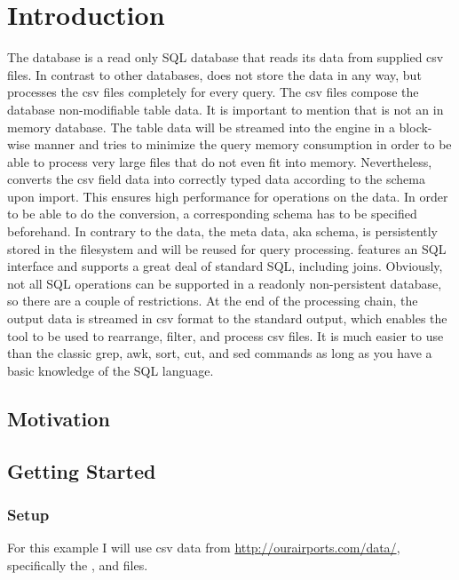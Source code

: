
\chapter{Introduction}
The \csvsqldb{} database is a read only SQL database that reads its data from supplied csv files. In contrast to other databases, \csvsqldb{} does not store the data in any way, but processes the csv files completely for every query. The csv files compose the database non-modifiable table data. It is important to mention that \csvsqldb{} is not an in memory database. The table data will be streamed into the engine in a block-wise manner and \csvsqldb{} tries to minimize the query memory consumption in order to be able to process very large files that do not even fit into memory. Nevertheless, \csvsqldb{} converts the csv field data into correctly typed data according to the schema upon import. This ensures high performance for operations on the data. In order to be able to do the conversion, a corresponding schema has to be specified beforehand. In contrary to the data, the meta data, aka schema, is persistently stored in the filesystem and will be reused for query processing. \csvsqldb{} features an SQL interface and supports a great deal of standard SQL, including joins. Obviously, not all SQL operations can be supported in a readonly non-persistent database, so there are a couple of restrictions. At the end of the processing chain, the output data is streamed in csv format to the standard output, which enables the tool to be used to rearrange, filter, and process csv files. It is much easier to use than the classic grep, awk, sort, cut, and sed commands as long as you have a basic knowledge of the SQL language.

\section{Motivation}

\section{Getting Started}

\subsection{Setup}
For this example I will use csv data from {\scriptsize \url{http://ourairports.com/data/}}, specifically the ,  and  files.

